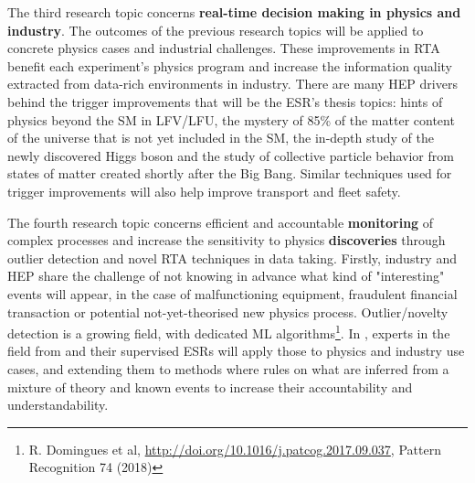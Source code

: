 The third research topic concerns \textbf{real-time decision making in physics and industry}. 
The outcomes of the previous research topics will be applied to concrete physics cases and industrial challenges. 
These improvements in RTA benefit each experiment's physics program and increase the information quality extracted from data-rich environments in industry.  
There are many HEP drivers behind the trigger improvements that will be the \acronym ESR's thesis topics: hints of physics beyond the SM in LFV/LFU, the mystery of 85\% of the matter content of the universe that is not yet included in the SM, the in-depth study of the newly discovered Higgs boson and the study of collective particle behavior from states of matter created shortly after the Big Bang. Similar techniques used for trigger improvements will also help improve transport and fleet safety. 
\begin{center}
\vskip-15pt
\end{center}

The fourth research topic concerns efficient and accountable \textbf{monitoring} of complex processes and increase the sensitivity to physics \textbf{discoveries} through outlier detection and novel RTA techniques in data taking. 
Firstly, industry and HEP share the challenge of not knowing in advance what kind of "interesting" events will appear, in the case of malfunctioning equipment, fraudulent financial transaction or potential not-yet-theorised new physics process. 
Outlier/novelty detection is a growing field, with dedicated ML algorithms\footnote{R. Domingues et al, \href{A comparative evaluation of outlier detection algorithms: experiments and analyses}{http://doi.org/10.1016/j.patcog.2017.09.037}, Pattern Recognition 74 (2018)}. In \acronym, experts in the field from \ibmentity and their supervised ESRs will apply those to physics and industry use cases, and extending them to methods where rules on what are inferred from a mixture of theory and known events to increase their accountability and understandability.
 
